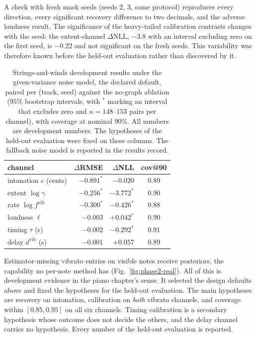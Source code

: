 A check with fresh mask seeds (seeds 2, 3, same protocol) reproduces
every direction, every significant recovery difference to two decimals,
and the adverse loudness result. The significance of the heavy-tailed
calibration contrasts changes with the seed: the extent-channel
$\Delta$NLL, $-3.8$ with an interval excluding zero on the first seed, is
$-0.22$ and not significant on the fresh seeds. This variability was
therefore known before the held-out evaluation rather than discovered by
it.

\begin{table}[t]\centering
\caption{Strings-and-winds development results under the given-variance
noise model, the declared default, paired per (track, seed) against the
no-graph ablation ($95\%$ bootstrap intervals, with $^{*}$ marking an
interval that excludes zero and $n = 148$--$153$ pairs per channel), with
coverage at nominal $90\%$. All numbers are development numbers. The
hypotheses of the held-out evaluation were fixed on these columns. The
fallback noise model is reported in the results record.}
\label{tab:phase2-dev}
\footnotesize
\begin{tabular}{@{}lrrc@{}}
\toprule
channel & $\Delta$RMSE & $\Delta$NLL & cov@90 \\
\midrule
intonation $c$ (cents) & $-0.891^{*}$ & $-0.020$\phantom{$^{*}$} & 0.89 \\
extent $\log\gamma$ & $-0.256^{*}$ & $-3.772^{*}$ & 0.90 \\
rate $\log f^{\mathrm{vib}}$ & $-0.300^{*}$ & $-0.426^{*}$ & 0.88 \\
loudness $\ell$ & $-0.003$\phantom{$^{*}$} & $+0.042^{*}$ & 0.90 \\
timing $\tau$ (s) & $-0.002$\phantom{$^{*}$} & $-0.292^{*}$ & 0.91 \\
delay $d^{\mathrm{vib}}$ (s) & $-0.001$\phantom{$^{*}$} & $+0.057$\phantom{$^{*}$} & 0.89 \\
\bottomrule
\end{tabular}
\end{table}

Estimator-missing vibrato entries on visible notes receive posteriors,
the capability no per-note method has (Fig.~\ref{fig:phase2-real}). All
of this is development evidence in the piano chapter's sense. It selected
the design defaults above and fixed the hypotheses for the held-out
evaluation. The main hypotheses are recovery on intonation, calibration
on \emph{both} vibrato channels, and coverage within $[0.85, 0.95]$ on
all six channels. Timing calibration is a secondary hypothesis whose
outcome does not decide the others, and the delay channel carries no
hypothesis. Every number of the held-out evaluation is reported.

